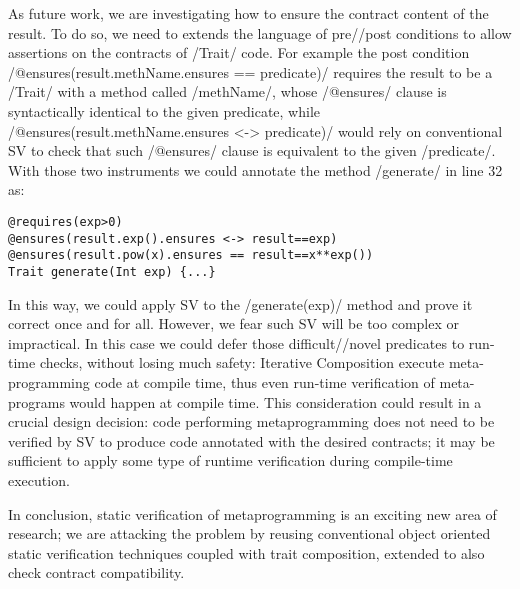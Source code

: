  As future work, we are investigating how to ensure
the contract content of the result.
To do so, we need to extends the language of pre//post conditions to allow assertions on the contracts of 
/Trait/ code.
For example the post condition 
/@ensures(result.methName.ensures == predicate)/
requires the result to be a /Trait/ with a method
called /methName/, whose /@ensures/ clause is syntactically identical to the given predicate,
 while
/@ensures(result.methName.ensures <-> predicate)/
would rely on conventional SV to check that 
such /@ensures/ clause is equivalent to the given /predicate/.
With those two instruments we could annotate the method
 /generate/ in line 32 as:
\begin{lstlisting}[firstnumber=32]
@requires(exp>0)
@ensures(result.exp().ensures <-> result==exp)
@ensures(result.pow(x).ensures == result==x**exp())
Trait generate(Int exp) {...}
\end{lstlisting}
\vspace{-1ex}
In this way, we could apply SV to the /generate(exp)/ method and prove it correct once and for all.
However, we fear such SV will be too complex or impractical. In this case we could defer those difficult//novel predicates to
run-time checks, without losing much safety:
Iterative Composition execute meta-programming code at
compile time, thus even run-time verification of meta-programs would happen at compile time.
This consideration could result in a crucial design decision: code performing metaprogramming does not need to be verified by SV to produce code annotated with the desired contracts; it may be sufficient to apply some type of runtime verification during compile-time execution.


In conclusion, static verification of metaprogramming is an exciting new area of research; we are attacking the problem by reusing conventional
object oriented static verification techniques coupled with trait composition, extended to also check contract compatibility.